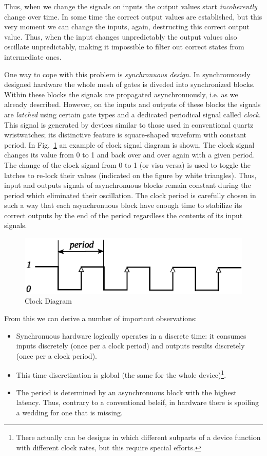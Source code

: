 Thus, when we change the signals on inputs the output values start \emph{incoherently} change over time. In some time
the correct output values are established, but this very moment we can change the inputs, again, destructing this correct
output value. Thus, when the input changes unpredictably the output values also oscillate unpredictably, making it
impossible to filter out correct states from intermediate ones.

One way to cope with this problem is \emph{synchronuous design}. In synchronuously designed hardware the whole
mesh of gates is diveded into synchronized blocks. Within these blocks the signals are propagated asynchronuously, i.e.
as we already described. However, on the inputs and outputs of these blocks the signals are \emph{latched}
using certain gate types and a dedicated periodical signal called \emph{clock}. This signal is generated by devices
similar to those used in conventional quartz wristwatches; its distinctive feature is square-shaped waveform with
constant period. In Fig.~\ref{clock-diagram} an example of clock signal diagram is shown. The clock signal changes
its value from 0 to 1 and back over and over again with a given period. The change of the clock signal from 0 to 1 (or visa versa)
is used to toggle the latches to re-lock their values (indicated on the figure by white triangles). Thus, input and outputs
signals of asynchronuous blocks remain constant during the period which eliminated their oscillation. The clock period is carefully
chosen in such a way that each asynchronuous block have enough time to stabilize its correct outputs by the end of the period
regardless the contents of its input signals. 

\begin{figure}[t]
  \centering
  \includegraphics[scale=0.7]{images/06-10.eps}
  \caption{Clock Diagram}
  \label{clock-diagram}
\end{figure}

From this we can derive a number of important observations:

\begin{itemize}
\item Synchronuous hardware logically operates in a discrete time: it consumes inputs discretely (once per a clock period) and
  outputs results discretely (once per a clock period).
\item This time discretization is global (the same for the whole device)\footnote{There actually can be designs in which different
subparts of a device function with different clock rates, but this require special efforts.}.
\item The period is determined by an asynchronuous block with the highest latency. Thus, contrary to a conventional beleif, in hardware
there is spoiling a wedding for one that is missing.
\end{itemize}


